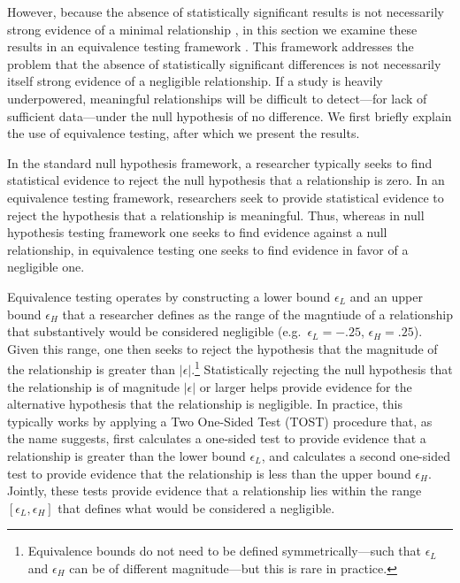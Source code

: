 \documentclass[
  12pt,
]{article}
\begin{document}
However, because the absence of statistically significant results is not necessarily strong evidence of a minimal relationship \citep{Rainey2014}, in this section we examine these results in an equivalence testing framework \citep{Rainey2014, Hartman2018, Lakens2017}. This framework addresses the problem that the absence of statistically significant differences is not necessarily itself strong evidence of a negligible relationship. If a study is heavily underpowered, meaningful relationships will be difficult to detect---for lack of sufficient data---under the null hypothesis of no difference. We first briefly explain the use of equivalence testing, after which we present the results.

In the standard null hypothesis framework, a researcher typically seeks to find statistical evidence to reject the null hypothesis that a relationship is zero. In an equivalence testing framework, researchers seek to provide statistical evidence to reject the hypothesis that a relationship is meaningful. Thus, whereas in null hypothesis testing framework one seeks to find evidence against a null relationship, in equivalence testing one seeks to find evidence in favor of a negligible one.

Equivalence testing operates by constructing a lower bound \(\epsilon_L\) and an upper bound \(\epsilon_H\) that a researcher defines as the range of the magntiude of a relationship that substantively would be considered negligible (e.g.~\(\epsilon_L = -.25\), \(\epsilon_H = .25\)). Given this range, one then seeks to reject the hypothesis that the magnitude of the relationship is greater than \(|\epsilon|\).\footnote{Equivalence bounds do not need to be defined symmetrically---such that \(\epsilon_L\) and \(\epsilon_H\) can be of different magnitude---but this is rare in practice.} Statistically rejecting the null hypothesis that the relationship is of magnitude \(|\epsilon|\) or larger helps provide evidence for the alternative hypothesis that the relationship is negligible. In practice, this typically works by applying a Two One-Sided Test (TOST) procedure that, as the name suggests, first calculates a one-sided test to provide evidence that a relationship is greater than the lower bound \(\epsilon_L\), and calculates a second one-sided test to provide evidence that the relationship is less than the upper bound \(\epsilon_H\). Jointly, these tests provide evidence that a relationship lies within the range \([\epsilon_L, \epsilon_H]\) that defines what would be considered a negligible.
\end{document}

